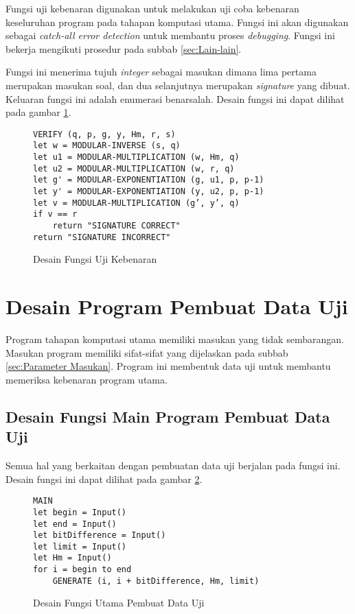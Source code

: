 Fungsi uji kebenaran digunakan untuk melakukan uji coba kebenaran keseluruhan program pada tahapan komputasi utama. Fungsi ini akan digunakan sebagai \textit{catch-all error detection} untuk membantu proses \textit{debugging}. Fungsi ini bekerja mengikuti prosedur pada subbab \ref{sec:Lain-lain}.

Fungsi ini menerima tujuh \textit{integer} sebagai masukan dimana lima pertama merupakan masukan soal, dan dua selanjutnya merupakan \textit{signature} yang dibuat. Keluaran fungsi ini adalah enumerasi benar\textendash salah. Desain fungsi ini dapat dilihat pada gambar \ref{psdo:verify}.
\begin{figure}[h!]
\begin{lstlisting}[firstnumber=0]
VERIFY (q, p, g, y, Hm, r, s)
let w = MODULAR-INVERSE (s, q)
let u1 = MODULAR-MULTIPLICATION (w, Hm, q)
let u2 = MODULAR-MULTIPLICATION (w, r, q)
let g' = MODULAR-EXPONENTIATION (g, u1, p, p-1)
let y' = MODULAR-EXPONENTIATION (y, u2, p, p-1)
let v = MODULAR-MULTIPLICATION (g’, y’, q)
if v == r
	return "SIGNATURE CORRECT"
return "SIGNATURE INCORRECT"
\end{lstlisting}
\caption{Desain Fungsi Uji Kebenaran}
\label{psdo:verify}
\end{figure}

\section{Desain Program Pembuat Data Uji}

Program tahapan komputasi utama memiliki masukan yang tidak sembarangan. Masukan program memiliki sifat-sifat yang dijelaskan pada subbab \ref{sec:Parameter Masukan}. Program ini membentuk data uji untuk membantu memeriksa kebenaran program utama.

\subsection{Desain Fungsi Main Program Pembuat Data Uji}

Semua hal yang berkaitan dengan pembuatan data uji berjalan pada fungsi ini. Desain fungsi ini dapat dilihat pada gambar \ref{psdo:main_generator}.

\begin{figure}[h!]
\begin{lstlisting}[firstnumber=0]
MAIN
let begin = Input()
let end = Input()
let bitDifference = Input()
let limit = Input()
let Hm = Input()
for i = begin to end
	GENERATE (i, i + bitDifference, Hm, limit)
\end{lstlisting}
\caption{Desain Fungsi Utama Pembuat Data Uji}
\label{psdo:main_generator}
\end{figure}


